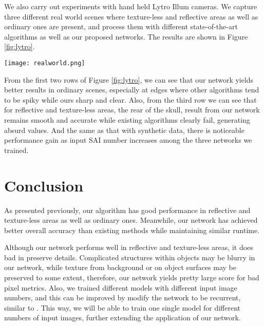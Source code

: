 \documentclass[10pt,twocolumn,letterpaper]{article}
\begin{document}
We also carry out experiments with hand held Lytro Illum cameras. We capture three different real world scenes where texture-less and reflective areas as well as ordinary ones are present, and process them with different state-of-the-art algorithms as well as our proposed networks. The results are shown in Figure \ref{fig:lytro}.

\begin{figure*}
	\begin{center}
		\texttt{[image: realworld.png]}
	\end{center}
	\caption{Real world results. (a)thumbnail (b)\cite{shin2018epinet} (c)\cite{zhang2016robust} (d)\cite{jeon2015accurate} (e)Ours(VommaNet\_81)}
	\label{fig:lytro}
\end{figure*}

From the first two rows of Figure \ref{fig:lytro}, we can see that our network yields better results in ordinary scenes, especially at edges where other algorithms tend to be spiky while ours sharp and clear. Also, from the third row we can see that for reflective and texture-less areas, \eg the rear of the skull, result from our network remains smooth and accurate while existing algorithms clearly fail, generating absurd values. And the same as that with synthetic data, there is noticeable performance gain as input SAI number increases among the three networks we trained.

\section{Conclusion}

As presented previously, our algorithm has good performance in reflective and texture-less areas as well as ordinary ones. Meanwhile, our network has achieved better overall accuracy than existing methods while maintaining similar runtime.

Although our network performs well in reflective and texture-less areas, it does bad in preserve details. Complicated structures within objects may be blurry in our network, while texture from background or on object surfaces may be preserved to some extent, therefore, our network yields pretty large score for bad pixel metrics. Also, we trained different models with different input image numbers, and this can be improved by modify the network to be recurrent, similar to \cite{choy20163d}. This way, we will be able to train one single model for different numbers of input images, further extending the application of our network.


{\small


}
\end{document}
